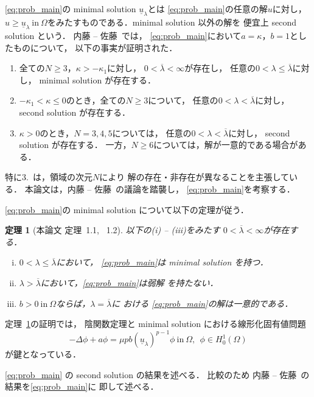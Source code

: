 \documentclass{jsarticle}
\newcommand{\sage}{
\addtolength{\itemindent}{1zw}
\addtolength{\parindent}{1zw}}
\theoremstyle{plain}
\newtheorem{thm}{定理}
\renewcommand{\bar}[1]{\overline{#1}}
\newcommand{\tin}{\text{in}~}
\begin{document}
\ref{eq:prob_main}の minimal solution $\underline{u}_\lambda$とは
\ref{eq:prob_main}の任意の解$u$に対し，$u \geq \underline{u}_\lambda
~\tin \Omega$をみたすものである．minimal solution 以外の解を
便宜上 second solution という．
内藤 -- 佐藤~\cite{MR2886160}では，
\ref{eq:prob_main}において$a = \kappa$，$b = 1$としたものについて，
以下の事実が証明された．
\begin{enumerate}[1.] \sage
 \item 全ての$N \geq 3$，$\kappa > - \kappa_1$に対し，
       $0 < \bar{\lambda} < \infty$が存在し，
       任意の$0 < \lambda \leq \bar{\lambda}$に対し，
       minimal solution が存在する．
 \item $-\kappa_1 < \kappa \leq 0$のとき，全ての$N \geq 3$について，
       任意の$0 < \lambda < \bar{\lambda}$に対し，
       second solution が存在する．
 \item $\kappa > 0$のとき，$N = 3, 4, 5$については，
       任意の$0 < \lambda < \bar{\lambda}$に対し，
       second solution が存在する．
       一方，$N \geq 6$については，解が一意的である場合がある．
\end{enumerate}
特に3.~は，領域の次元$N$により
解の存在・非存在が異なることを主張している．
本論文は，内藤 -- 佐藤~\cite{MR2886160}の議論を踏襲し，
\ref{eq:prob_main}を考察する．

\ref{eq:prob_main}の minimal solution について以下の定理が従う．
\begin{thm}[本論文 定理~1.1, ~1.2] \label{thm:minimal_solution}
以下の(i) -- (iii)をみたす
 $0 < \bar{\lambda} < \infty$が存在する．
 \begin{enumerate}[(i)]
  \item $0 < \lambda \leq \bar{\lambda}$において，
        \ref{eq:prob_main}は minimal solution を持つ．
  \item $\lambda > \bar{\lambda}$において，\ref{eq:prob_main}は弱解
        を持たない．
  \item $b > 0 ~\tin \Omega$ならば，$\lambda = \bar{\lambda}$に
        おける
        \ref{eq:prob_main}の解は一意的である．
 \end{enumerate}
\end{thm}

定理~\ref{thm:minimal_solution}の証明では，
陰関数定理と minimal solution における線形化固有値問題
\[
-\Delta \phi + a \phi = \mu p b (\underline{u}_\lambda)^{p-1} \phi
  ~\tin \Omega, \ \ \phi \in H_0^1(\Omega)
\] 
が鍵となっている．

\ref{eq:prob_main} の second solution の結果を述べる．
比較のため 内藤 -- 佐藤~\cite{MR2886160}の結果を\ref{eq:prob_main}に
即して述べる．
\end{document}
